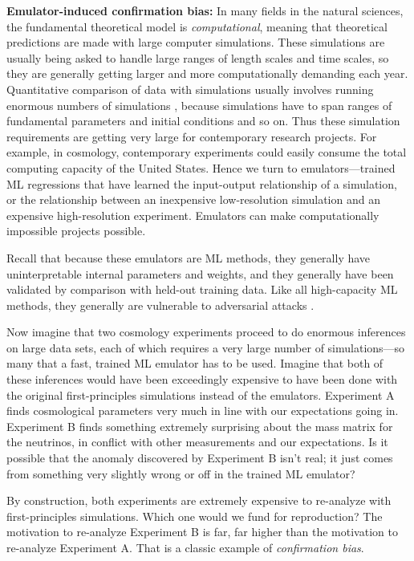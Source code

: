 \documentclass{article}
\renewcommand{\paragraph}[1]{\noindent\par\textbf{#1}}
\begin{document}
\paragraph{Emulator-induced confirmation bias:}
In many fields in the natural sciences, the fundamental theoretical model is \emph{computational}, meaning that theoretical predictions are made with large computer simulations.
These simulations are usually being asked to handle large ranges of length scales and time scales, so they are generally getting larger and more computationally demanding each year.
Quantitative comparison of data with simulations usually involves running enormous numbers of simulations \cite{abc}, because simulations have to span ranges of fundamental parameters and initial conditions and so on.
Thus these simulation requirements are getting very large for contemporary research projects.
For example, in cosmology, contemporary experiments could easily consume the total computing capacity of the United States.
Hence we turn to emulators---trained ML regressions that have learned the input-output relationship of a simulation, or the relationship between an inexpensive low-resolution simulation and an expensive high-resolution experiment.
Emulators can make computationally impossible projects possible.

Recall that because these emulators are ML methods, they generally have uninterpretable internal parameters and weights, and they generally have been validated by comparison with held-out training data.
Like all high-capacity ML methods, they generally are vulnerable to adversarial attacks \cite{adversarial1}.

Now imagine that two cosmology experiments proceed to do enormous inferences on large data sets, each of which requires a very large number of simulations---so many that a fast, trained ML emulator has to be used.
Imagine that both of these inferences would have been exceedingly expensive to have been done with the original first-principles simulations instead of the emulators.
Experiment A finds cosmological parameters very much in line with our expectations going in.
Experiment B finds something extremely surprising about the mass matrix for the neutrinos, in conflict with other measurements and our expectations.
Is it possible that the anomaly discovered by Experiment B isn't real; it just comes from something very slightly wrong or off in the trained ML emulator?

By construction, both experiments are extremely expensive to re-analyze with first-principles simulations.
Which one would we fund for reproduction?
The motivation to re-analyze Experiment B is far, far higher than the motivation to re-analyze Experiment A.
That is a classic example of \emph{confirmation bias}.
\end{document}
